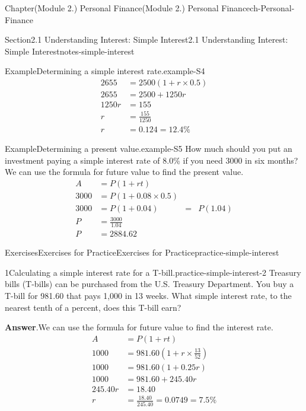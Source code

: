 \documentclass[oneside,10pt,]{book}
\newcommand{\blocktitlefont}{\relax}
\newcommand{\amp}{&}
\begin{document}
\begin{chapterptx}{Chapter}{(Module 2.) Personal Finance}{}{(Module 2.) Personal Finance}{}{}{ch-Personal-Finance}
\begin{sectionptx}{Section}{2.1 Understanding Interest: Simple Interest}{}{2.1 Understanding Interest: Simple Interest}{}{}{notes-simple-interest}
\begin{example}{Example}{Determining a simple interest rate.}{example-S4}
\begin{align*}
2655 \amp =  2500(1 + r \times 0.5)\\
2655 \amp =  2500 + 1250r\\
1250r \amp =  155\\
r \amp = \frac{155}{1250} \\
r \amp =  0.124 = 12.4\%
\end{align*}
\end{example}
\begin{example}{Example}{Determining a present value.}{example-S5}%
How much should you put an investment paying a simple interest rate of 8.0\% if you need \textdollar{}3000 in six months?%
\noindent\hypertarget{example-S5-3}{}We can use the formula for future value to find the present value.%
%
\begin{align*}
A \amp = P(1 + rt)\\
3000 \amp = P(1 + 0.08 \times 0.5)\\
3000 \amp = P(1 + 0.04)\amp = \amp P(1.04) \\
P \amp = \frac{3000}{1.04} \\
P \amp = 2884.62 
\end{align*}
\end{example}
%
%
\typeout{************************************************}
\typeout{************************************************}
%
\begin{exercises-subsection-numberless}{Exercises}{Exercises for Practice}{}{Exercises for Practice}{}{}{practice-simple-interest}
\begin{divisionexercise}{1}{Calculating a simple interest rate for a T-bill.}{}{practice-simple-interest-2}%
Treasury bills (T-bills) can be purchased from the U.S. Treasury Department. You buy a T-bill for \textdollar{}981.60 that pays \textdollar{}1,000 in 13 weeks. What simple interest rate, to the nearest tenth of a percent, does this T-bill earn?%
\par\smallskip%
\noindent\textbf{\blocktitlefont Answer}.\hypertarget{practice-simple-interest-2-3}{}\quad{}We can use the formula for future value to find the interest rate.%
%
\begin{align*}
A \amp = P(1 + rt)\\
1000 \amp = 981.60(1 + r \times \frac{13}{52})\\
1000 \amp = 981.60(1 + 0.25r)\\
1000 \amp = 981.60 + 245.40r\\
245.40r \amp =18.40\\
r \amp = \frac{18.40}{245.40} = 0.0749 = 7.5\%

\end{align*}
\end{divisionexercise}
\end{exercises-subsection-numberless}
\end{sectionptx}
\end{chapterptx}
\end{document}
